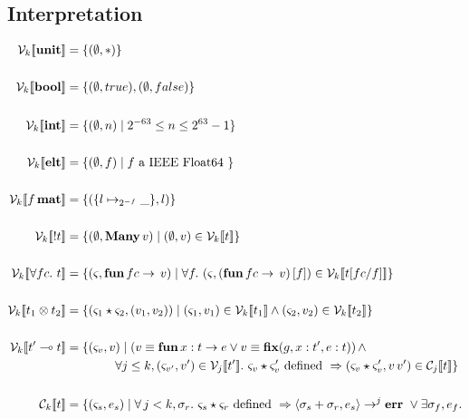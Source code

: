 \subsection{Interpretation}

\begin{align*}
  \V{k}{ \Unit } &= \{ (\empH, \ast) \} \\
\\
    \V{k}{ \Bool } &= \{ (\empH, true), (\empH, false) \} \\
\\
    \V{k}{ \Int } &= \{ (\empH, n) \mid 2^{-63} \leq n \leq 2^{63} -1 \} \\
\\
    \V{k}{ \Elt } &= \{ (\empH, f) \mid f \textrm{ a IEEE Float64 } \} \\
\\
    \V{k}{ f \, \Mat } &= \{ (\{ l \mapsto_{2^{-f}} \_ \} , l) \} \\
\\
    \V{k}{ \Bang t } &= \{ (\empH, \Many\, v) \mid (\empH, v) \in \V{k}{t} \} \\
\\
    \V{k}{ \forall fc.\  t } &= \{ (\varsigma, \ottkw{fun}\, fc \rightarrow \, v) \mid \forall f.\ (\varsigma, (\ottkw{fun}\, fc \rightarrow \, v)\, [ f ]) \in \V{k}{ t [ fc / f ] } \} \\
\\
    \V{k}{ t_1 \otimes t_2 } &= \{ (\varsigma_1 \star \varsigma_2, ( v_1, v_2 )) \mid (\varsigma_1, v_1) \in \V{k}{t_1} \wedge (\varsigma_2, v_2) \in \V{k}{t_2} \} \\
\\
    \V{k}{ t' \multimap t } &= \{ (\varsigma_v, v ) \mid ( v \equiv \ottkw{fun}\, x : t \rightarrow e \vee v \equiv \ottkw{fix} (g, x : t' , e : t) ) \, \wedge\\
                            & \qquad \qquad \forall j \leq k, (\varsigma_{v'}, v') \in \V{j}{ t' }.\ \varsigma_v \star \varsigma_v' \textrm{ defined } \Rightarrow (\varsigma_v \star \varsigma_v', v\, v') \in \C{j}{t} \} \\
\\
    \C{k}{ t } &= \{ (\varsigma_s, e_s) \mid \forall \, j < k, \sigma_r.\ \varsigma_s \star \varsigma_r \textrm{ defined } \Rightarrow \langle \sigma_s + \sigma_r, e_s \rangle \rightarrow^j \ottkw{err}\ \vee \exists \sigma_f, e_f.\\

\end{align*}
